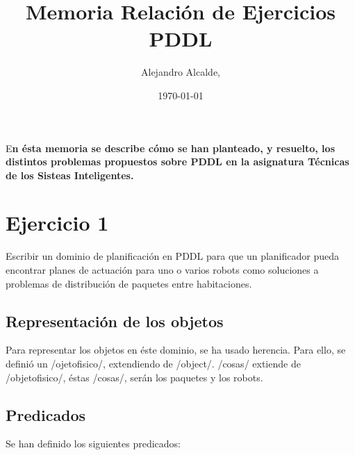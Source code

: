 \documentclass[	DIV=calc,%
							paper=a4,%
							fontsize=11pt]{scrartcl}	 					%
\title{Memoria Relación de Ejercicios PDDL}					%
\author{Alejandro Alcalde, }											%
\date{\usefont{T1}{mdugm}{b}{it}\selectfont\today}																				%
\newcommand{\initial}[1]{%
     \lettrine[lines=3,lhang=0.3,nindent=0em]{
     				\color{DarkGoldenrod}
     				{\textsf{#1}}}{}}
\newcommand{\miit}[1]{{\usefont{T1}{mdugm}{m}{it}\selectfont #1}}
\begin{document}
\maketitle
\thispagestyle{fancy} 			%
\initial{E}\textbf{n ésta memoria se describe cómo se han planteado, y resuelto, los distintos problemas propuestos sobre PDDL en la asignatura Técnicas de los Sisteas Inteligentes.}

\section{Ejercicio 1}

\miit{Escribir un dominio de planificación en PDDL para que un planificador pueda encontrar planes de actuación para uno o varios robots como
soluciones a problemas de distribución de paquetes entre habitaciones.}

\subsection{Representación de los objetos}

Para representar los objetos en éste dominio, se ha usado herencia. Para ello, se definió un \newlispinline/ojetofisico/, extendiendo de \newlispinline/object/. \newlispinline/cosas/ extiende de \newlispinline/objetofisico/, éstas \newlispinline/cosas/, serán los paquetes y los robots.

\subsection{Predicados}

Se han definido los siguientes predicados:
\end{document}
